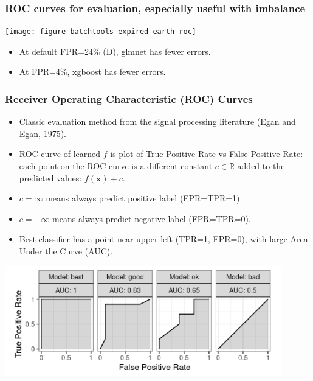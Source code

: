 \documentclass[t]{beamer}
\begin{document}
\begin{frame}
  \frametitle{ROC curves for evaluation, especially useful with imbalance}

  \texttt{[image: figure-batchtools-expired-earth-roc]}

  \begin{itemize}
  \item At default FPR=24\% (D), glmnet has fewer errors.
  \item At FPR=4\%, xgboost has fewer errors.
  \end{itemize}
\end{frame}

\begin{frame}
  \frametitle{Receiver Operating Characteristic (ROC) Curves}
  \begin{itemize}
  \item Classic evaluation method from the signal processing
    literature (Egan and Egan, 1975).
  \item ROC curve of learned $f$ is plot of True
    Positive Rate vs False Positive Rate: each point on the ROC curve
    is a different constant $c\in\mathbb R$ added to the predicted
    values: $f(\mathbf x)+c$.
  \item $c=\infty$ means always predict positive label (FPR=TPR=1).
  \item $c=-\infty$ means always predict negative label (FPR=TPR=0).
  \item Best classifier has a point near upper left (TPR=1, FPR=0), with large
    Area Under the Curve (AUC).
  \end{itemize}
  \includegraphics[width=0.9\textwidth]{figure-more-than-one-new-binary}
\end{frame}
\end{document}
